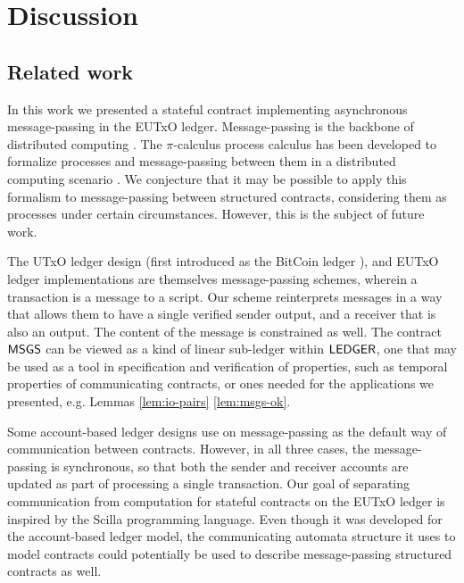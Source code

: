 \section{Discussion}
\label{sec:discussion}

\subsection{Related work}
\label{sec:related}

In this work we presented a stateful contract implementing asynchronous message-passing
in the EUTxO ledger. Message-passing is the backbone of distributed computing \cite{distributed}
\cite{design}. The $\pi$-calculus process calculus has been developed to formalize
processes and message-passing between them in a distributed computing scenario
\cite{picalc}. We conjecture that it may be possible to apply this formalism to
message-passing between structured contracts, considering them as processes
under certain circumstances. However, this is the subject of future work.

The UTxO ledger design (first introduced as the BitCoin ledger \cite{bitcoin}),
and EUTxO ledger implementations \cite{algorand} \cite{ergo} \cite{nervos} are themselves
message-passing schemes, wherein a transaction is a message to a script.
Our scheme reinterprets messages in a way that allows them to have a single verified
sender output, and a receiver that is also an output. The content of the message
is constrained as well. The contract $\mathsf{MSGS}$
can be viewed as a kind of linear sub-ledger within $\mathsf{LEDGER}$, one that may be
used as a tool in specification and verification of properties, such as temporal
properties of communicating contracts, or ones needed for the applications we presented, e.g.
Lemmas \ref{lem:io-pairs} \ref{lem:msgs-ok}.

Some account-based ledger designs \cite{ethereum} \cite{tezos} \cite{zilliqa}
use on message-passing as the default way of communication between contracts.
However, in all three cases, the message-passing is synchronous, so that both
the sender and receiver accounts are updated as part of processing a single transaction.
Our goal of separating communication from computation for stateful contracts
on the EUTxO ledger is inspired by the Scilla \cite{scilla} programming language.
Even though it was developed for the account-based ledger model, the communicating
automata structure it uses to model contracts could potentially be used to
describe message-passing structured contracts as well.

